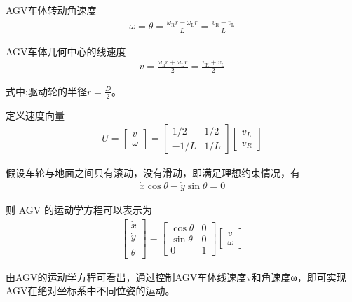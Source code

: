 \documentclass[cs4size,a4paper]{ctexart}
\numberwithin{equation}{section}
\numberwithin{table}{section}
\numberwithin{figure}{section}
\begin{document}
AGV车体转动角速度
\begin{align}
    \omega=\dot{\theta}=\frac{\omega_{\mathrm{R}} r-\omega_{\mathrm{L}} r}{L}=\frac{v_{\mathrm{R}}-v_{\mathrm{L}}}{L}
\end{align}

AGV车体几何中心的线速度
\begin{align}
    v=\frac{\omega_{\mathrm{n}} r+\omega_{\mathrm{L}} r}{2}=\frac{v_{\mathrm{R}}+v_{\mathrm{L}}}{2}
\end{align}

式中:驱动轮的半径$r=\frac{D}{2}$。

定义速度向量
\begin{align}
    U=\left[\begin{array}{l}
        v \\
        \omega
        \end{array}\right]=\left[\begin{array}{cc}
        1 / 2 & 1 / 2 \\
        -1 / L & 1 / L
        \end{array}\right]\left[\begin{array}{l}
        v_{L} \\
        v_{R}
        \end{array}\right]
\end{align}

假设车轮与地面之间只有滚动，没有滑动，即满足理想约束情况，有
\begin{align}
    \dot{x} \cos \theta-\dot{y} \sin \theta = 0
\end{align}

则 AGV 的运动学方程可以表示为
\begin{align}
    \left[\begin{array}{c}
        \dot{x} \\
        \dot{y} \\
        \dot{\theta}
        \end{array}\right]=\left[\begin{array}{cc}
        \cos \theta & 0 \\
        \sin \theta & 0 \\
        0 & 1
        \end{array}\right]\left[\begin{array}{l}
        v \\
        \omega
        \end{array}\right]
\end{align}

由AGV的运动学方程可看出，通过控制AGV车体线速度v和角速度ω，即可实现AGV在绝对坐标系中不同位姿的运动。
\end{document}
